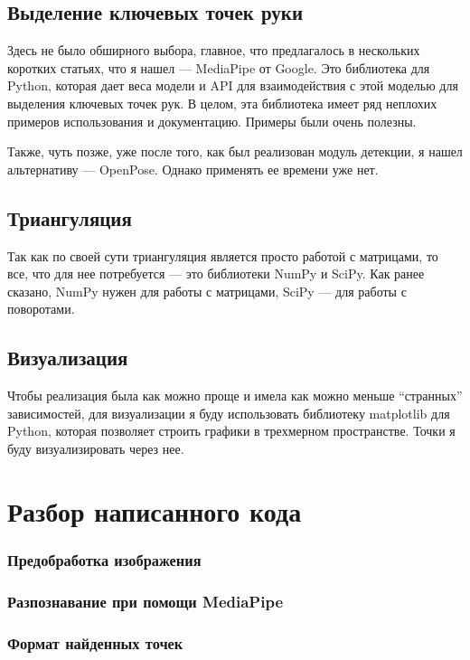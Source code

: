\documentclass[12pt, a4paper]{article}
\begin{document}
\subsection{Выделение ключевых точек руки}
Здесь не было обширного выбора, главное, что предлагалось в нескольких коротких
статьях, что я нашел --- MediaPipe от Google. Это библиотека для Python, которая
дает веса модели и API для взаимодействия с этой моделью для выделения ключевых
точек рук. В целом, эта библиотека имеет ряд неплохих примеров использования и
документацию. Примеры были очень полезны.
\par
Также, чуть позже, уже после того, как был реализован модуль детекции, я нашел альтернативу --- OpenPose. Однако применять ее времени уже нет.

\subsection{Триангуляция}
Так как по своей сути триангуляция является просто работой с матрицами, то все, что для нее потребуется --- это библиотеки NumPy и SciPy. Как ранее сказано, NumPy нужен для работы с матрицами, SciPy --- для работы с поворотами.

\subsection{Визуализация}
Чтобы реализация была как можно проще и имела как можно меньше ``странных''
зависимостей, для визуализации я буду использовать библиотеку matplotlib для
Python, которая позволяет строить графики в трехмерном пространстве. Точки я
буду визуализировать через нее.

\section{Разбор написанного кода}

\subsubsection{Предобработка изображения}
\subsubsection{Разпознавание при помощи MediaPipe}
\subsubsection{Формат найденных точек}
\end{document}

